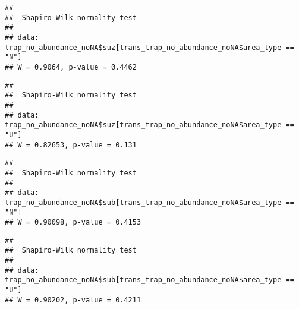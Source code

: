 \documentclass[
]{article}
\newenvironment{Shaded}{\begin{snugshade}}{\end{snugshade}}
\newcommand{\FunctionTok}[1]{\textcolor[rgb]{0.13,0.29,0.53}{\textbf{#1}}}
\newcommand{\NormalTok}[1]{#1}
\newcommand{\SpecialCharTok}[1]{\textcolor[rgb]{0.81,0.36,0.00}{\textbf{#1}}}
\newcommand{\StringTok}[1]{\textcolor[rgb]{0.31,0.60,0.02}{#1}}
\begin{document}
\begin{verbatim}
## 
##  Shapiro-Wilk normality test
## 
## data:  trap_no_abundance_noNA$suz[trans_trap_no_abundance_noNA$area_type == "N"]
## W = 0.9064, p-value = 0.4462
\end{verbatim}

\begin{Shaded}
\end{Shaded}

\begin{verbatim}
## 
##  Shapiro-Wilk normality test
## 
## data:  trap_no_abundance_noNA$suz[trans_trap_no_abundance_noNA$area_type == "U"]
## W = 0.82653, p-value = 0.131
\end{verbatim}

\begin{Shaded}
\end{Shaded}

\begin{verbatim}
## 
##  Shapiro-Wilk normality test
## 
## data:  trap_no_abundance_noNA$sub[trans_trap_no_abundance_noNA$area_type == "N"]
## W = 0.90098, p-value = 0.4153
\end{verbatim}

\begin{Shaded}
\end{Shaded}

\begin{verbatim}
## 
##  Shapiro-Wilk normality test
## 
## data:  trap_no_abundance_noNA$sub[trans_trap_no_abundance_noNA$area_type == "U"]
## W = 0.90202, p-value = 0.4211
\end{verbatim}
\end{document}
